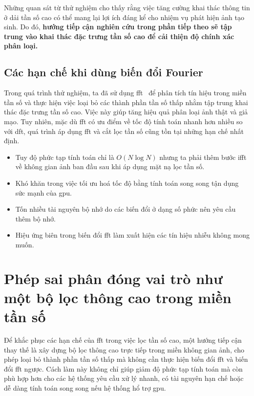 Những quan sát từ thử nghiệm cho thấy rằng việc tăng cường khai thác thông tin ở dải tần số cao có thể mang lại lợi ích đáng kể cho nhiệm vụ phát hiện ảnh tạo sinh. Do đó, \textbf{hướng tiếp cận nghiên cứu trong phần tiếp theo sẽ tập trung vào khai thác đặc trưng tần số cao để cải thiện độ chính xác phân loại.}

\subsection{Các hạn chế khi dùng biến đổi Fourier}

Trong quá trình thử nghiệm, ta đã sử dụng \gls{fft}~\cite{Arunachalam2013TheFF} để phân tích tín hiệu trong miền tần số và thực hiện việc loại bỏ các thành phần tần số thấp nhằm tập trung khai thác đặc trưng tần số cao. Việc này giúp tăng hiệu quả phân loại ảnh thật và giả mạo. Tuy nhiên, mặc dù \gls{fft} có ưu điểm về tốc độ tính toán nhanh hơn nhiều so với \gls{dft}, quá trình áp dụng \gls{fft} và cắt lọc tần số cũng tồn tại những hạn chế nhất định.

\begin{itemize}
	\item Tuy độ phức tạp tính toán chỉ là $O(N\log{N})$ nhưng ta phải thêm bước \gls{ifft} về không gian ảnh ban đầu sau khi áp dụng mặt nạ lọc tần số.
	\item Khó khăn trong việc tối ưu hoá tốc độ bằng tính toán song song tận dụng sức mạnh của \gls{gpu}.
	\item Tốn nhiều tài nguyên bộ nhớ do các biến đổi ở dạng số phức nên yêu cầu thêm bộ nhớ.
	\item Hiệu ứng biên trong biến đổi \gls{fft} làm xuất hiện các tín hiệu nhiễu không mong muốn.
\end{itemize}

\section{Phép sai phân đóng vai trò như một bộ lọc thông cao trong miền tần số}

Để khắc phục các hạn chế của \gls{fft} trong việc lọc tần số cao, một hướng tiếp cận thay thế là xây dựng bộ lọc thông cao trực tiếp trong miền không gian ảnh, cho phép loại bỏ thành phần tần số thấp mà không cần thực hiện biến đổi \gls{fft} và biến đổi \gls{fft} ngược.
%
Cách làm này không chỉ giúp giảm độ phức tạp tính toán mà còn phù hợp hơn cho các hệ thống yêu cầu xử lý nhanh, có tài nguyên hạn chế hoặc dễ dàng tính toán song song nếu hệ thống hổ trợ \gls{gpu}.

